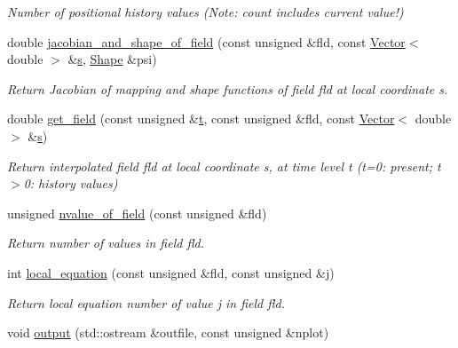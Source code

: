 \begin{DoxyCompactItemize}
\begin{DoxyCompactList}\small\item\em Number of positional history values (Note\+: count includes current value!) \end{DoxyCompactList}\item 
double \hyperlink{classoomph_1_1ProjectableAxisymmetricPoroelasticityElement_a53a88c81a5225e213ca869e670ad1605}{jacobian\+\_\+and\+\_\+shape\+\_\+of\+\_\+field} (const unsigned \&fld, const \hyperlink{classoomph_1_1Vector}{Vector}$<$ double $>$ \&\hyperlink{cfortran_8h_ab7123126e4885ef647dd9c6e3807a21c}{s}, \hyperlink{classoomph_1_1Shape}{Shape} \&psi)
\begin{DoxyCompactList}\small\item\em Return Jacobian of mapping and shape functions of field fld at local coordinate s. \end{DoxyCompactList}\item 
double \hyperlink{classoomph_1_1ProjectableAxisymmetricPoroelasticityElement_aba62f3460cbd779f3193be8e48fdb636}{get\+\_\+field} (const unsigned \&\hyperlink{cfortran_8h_af6f0bd3dc13317f895c91323c25c2b8f}{t}, const unsigned \&fld, const \hyperlink{classoomph_1_1Vector}{Vector}$<$ double $>$ \&\hyperlink{cfortran_8h_ab7123126e4885ef647dd9c6e3807a21c}{s})
\begin{DoxyCompactList}\small\item\em Return interpolated field fld at local coordinate s, at time level t (t=0\+: present; t$>$0\+: history values) \end{DoxyCompactList}\item 
unsigned \hyperlink{classoomph_1_1ProjectableAxisymmetricPoroelasticityElement_a8082f4f9da812ae6965e20838ecce8d2}{nvalue\+\_\+of\+\_\+field} (const unsigned \&fld)
\begin{DoxyCompactList}\small\item\em Return number of values in field fld. \end{DoxyCompactList}\item 
int \hyperlink{classoomph_1_1ProjectableAxisymmetricPoroelasticityElement_a083614b12898ca9057debe48aa81364a}{local\+\_\+equation} (const unsigned \&fld, const unsigned \&j)
\begin{DoxyCompactList}\small\item\em Return local equation number of value j in field fld. \end{DoxyCompactList}\item 
void \hyperlink{classoomph_1_1ProjectableAxisymmetricPoroelasticityElement_af234691b4a8de7ac8e0b786d94c0fdab}{output} (std\+::ostream \&outfile, const unsigned \&nplot)

\end{DoxyCompactItemize}
